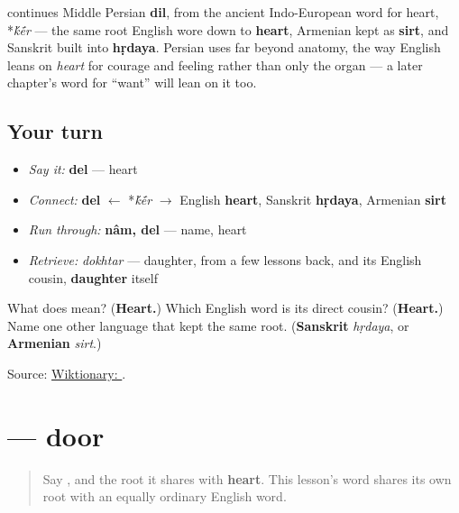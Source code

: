 \begin{cousinweb}
\textbf{} continues Middle Persian \textbf{dil}, from the ancient Indo-European word for heart, *\emph{\'{k}\'{\={e}}r} — the same root English wore down to \textbf{heart}, Armenian kept as \textbf{sirt}, and Sanskrit built into \textbf{hṛdaya}. Persian uses \textbf{} far beyond anatomy, the way English leans on \emph{heart} for courage and feeling rather than only the organ — a later chapter's word for \textquotedblleft{}want\textquotedblright{} will lean on it too.
\end{cousinweb}

\subsection*{Your turn}
\begin{itemize}
\raggedright
  \item \emph{Say it:} \textbf{del} — heart
  \item \emph{Connect:} \textbf{del} $\leftarrow$ *\emph{\'{k}\'{\={e}}r} $\to$ English \textbf{heart}, Sanskrit \textbf{hṛdaya}, Armenian \textbf{sirt}
  \item \emph{Run through:} \textbf{nâm, del} — name, heart
  \item \emph{Retrieve:} \emph{dokhtar} — daughter, from a few lessons back, and its English cousin, \textbf{daughter} itself
\end{itemize}

\begin{tcolorbox}[breakable,colback=teal!4,colframe=teal!35!black,title={Before you move on}]
What does \textbf{} mean? (\textbf{Heart.}) Which English word is its direct cousin? (\textbf{Heart.}) Name one other language that kept the same root. (\textbf{Sanskrit} \emph{hṛdaya}, or \textbf{Armenian} \emph{sirt}.)

Source: \href{https://en.wiktionary.org/wiki/\%D8\%AF\%D9\%84}{Wiktionary: }.
\end{tcolorbox}
\section[\texorpdfstring{\fa{در} (dar)}{در (dar)}]{ — door}

\label{lesson:FA-C12-dar}



\begin{quote}
Say \textbf{}, and the root it shares with \textbf{heart}. This lesson's word shares its own root with an equally ordinary English word.
\end{quote}

